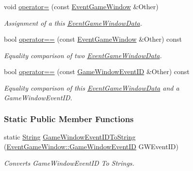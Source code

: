 \begin{DoxyCompactItemize}
void \hyperlink{classphys_1_1EventGameWindow_a730e2b5fd13cc23cdc56351880895f04}{operator=} (const \hyperlink{classphys_1_1EventGameWindow}{EventGameWindow} \&Other)
\begin{DoxyCompactList}\small\item\em Assignment of a this \hyperlink{classphys_1_1EventGameWindowData}{EventGameWindowData}. \item\end{DoxyCompactList}\item 
bool \hyperlink{classphys_1_1EventGameWindow_a5b73127941980949fe3be1ded2a4cd34}{operator==} (const \hyperlink{classphys_1_1EventGameWindow}{EventGameWindow} \&Other) const 
\begin{DoxyCompactList}\small\item\em Equality comparison of two \hyperlink{classphys_1_1EventGameWindowData}{EventGameWindowData}. \item\end{DoxyCompactList}\item 
bool \hyperlink{classphys_1_1EventGameWindow_abd3028a9c35ca2f5fd24e6b901054f24}{operator==} (const \hyperlink{classphys_1_1EventGameWindow_a45225255070513d3cff88cdfea25cc09}{GameWindowEventID} \&Other) const 
\begin{DoxyCompactList}\small\item\em Equality comparison of this \hyperlink{classphys_1_1EventGameWindowData}{EventGameWindowData} and a GameWindowEventID. \item\end{DoxyCompactList}\end{DoxyCompactItemize}
\subsubsection*{Static Public Member Functions}
\begin{DoxyCompactItemize}
\item 
static \hyperlink{namespacephys_aa03900411993de7fbfec4789bc1d392e}{String} \hyperlink{classphys_1_1EventGameWindow_a643c70f9137ea6812e53fa0993cd783a}{GameWindowEventIDToString} (\hyperlink{classphys_1_1EventGameWindow_a45225255070513d3cff88cdfea25cc09}{EventGameWindow::GameWindowEventID} GWEventID)
\begin{DoxyCompactList}\small\item\em Converts GameWindowEventID To Strings. \item\end{DoxyCompactList}\end{DoxyCompactItemize}
